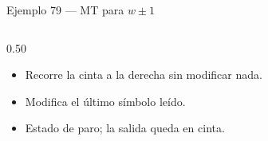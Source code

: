 \documentclass[aspectratio=1610, 12pt]{beamer}
\begin{document}
\begin{frame}[t]{Ejemplo 79 — MT para $w \pm 1$}
\begin{columns}[T]
\begin{column}{0.50\textwidth}
    \vspace{7pt}
    {\footnotesize
    \begin{itemize}\setlength{\itemsep}{3pt}
      \item[\textcolor{MedBlue}{$q_0$:}]
        Recorre la cinta a la derecha sin modificar nada.
      \item[\textcolor{MedBlue}{$q_1$:}]
        Modifica el último símbolo leído.
      \item[\textcolor{MedBlue}{$q_2$:}]
        Estado de paro; la salida queda en cinta.
    \end{itemize}}
  \end{column}

\end{columns}
\end{frame}


\end{document}
